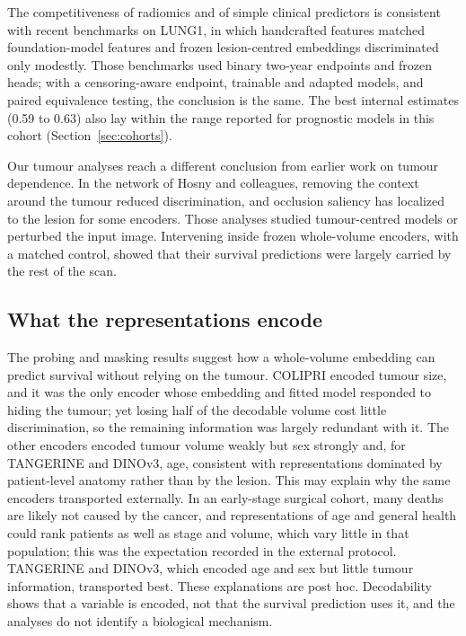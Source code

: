 The competitiveness of radiomics and of simple clinical predictors is consistent with recent benchmarks on LUNG1, in which handcrafted features matched foundation-model features\cite{neukirch2026} and frozen lesion-centred embeddings discriminated only modestly.\cite{aerts2025tib} Those benchmarks used binary two-year endpoints and frozen heads; with a censoring-aware endpoint, trainable and adapted models, and paired equivalence testing, the conclusion is the same. The best internal estimates (0.59 to 0.63) also lay within the range reported for prognostic models in this cohort (Section~\ref{sec:cohorts}).\cite{aerts2014}

Our tumour analyses reach a different conclusion from earlier work on tumour dependence. In the network of Hosny and colleagues, removing the context around the tumour reduced discrimination,\cite{hosny2018} and occlusion saliency has localized to the lesion for some encoders.\cite{aerts2025tib} Those analyses studied tumour-centred models or perturbed the input image. Intervening inside frozen whole-volume encoders, with a matched control, showed that their survival predictions were largely carried by the rest of the scan.

\subsection{What the representations encode}
The probing and masking results suggest how a whole-volume embedding can predict survival without relying on the tumour. COLIPRI encoded tumour size, and it was the only encoder whose embedding and fitted model responded to hiding the tumour; yet losing half of the decodable volume cost little discrimination, so the remaining information was largely redundant with it. The other encoders encoded tumour volume weakly but sex strongly and, for TANGERINE and DINOv3, age, consistent with representations dominated by patient-level anatomy rather than by the lesion. This may explain why the same encoders transported externally. In an early-stage surgical cohort, many deaths are likely not caused by the cancer, and representations of age and general health could rank patients as well as stage and volume, which vary little in that population; this was the expectation recorded in the external protocol. TANGERINE and DINOv3, which encoded age and sex but little tumour information, transported best. These explanations are post hoc. Decodability shows that a variable is encoded, not that the survival prediction uses it, and the analyses do not identify a biological mechanism.

